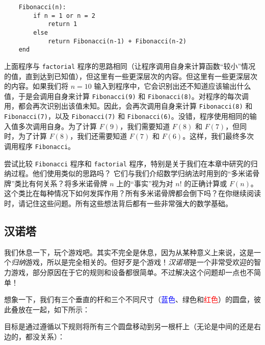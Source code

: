 \begin{verbatim}
    Fibonacci(n):
        if n = 1 or n = 2
            return 1
        else
            return Fibonacci(n-1) + Fibonacci(n-2)
    end
\end{verbatim}

上面程序与 \verb|factorial| 程序的思路相同（让程序调用自身来计算函数``较小''情况的值，直到达到已知值），但这里有一些更深层次的内容。但这里有一些更深层次的内容。如果我们将 $n = 10$ 输入到程序中，它会识别出还不知道应该输出什么值，于是会调用自身来计算 \verb|Fibonacci(9)| 和 \verb|Fibonacci(8)|。对程序的每次调用，都会再次识别出该值未知。因此，会再次调用自身来计算 \verb|Fibonacci(8)| 和 \verb|Fibonacci(7)|，以及 \verb|Fibonacci(7)| 和 \verb|Fibonacci(6)|。没错，程序使用相同的输入值多次调用自身。为了计算 $F(9)$，我们需要知道 $F(8)$ 和 $F(7)$，但同时，为了计算 $F(8)$，我们还需要知道 $F(7) $ 和 $F(6)$。这样，我们最终多次调用程序 \verb|Fibonacci|。

尝试比较 \verb|Fibonacci| 程序和 \verb|factorial| 程序，特别是关于我们在本章中研究的归纳过程。他们使用类似的思路吗？ 它们与我们介绍数学归纳法时用到的``多米诺骨牌''类比有何关系？将多米诺骨牌 $n$ 上的``事实''视为对 $n!$ 的正确计算或 $F(n)$。这个类比在每种情况下如何发挥作用？所有多米诺骨牌都会倒下吗？在你继续阅读时，请记住这些问题。所有这些想法背后都有一些非常强大的数学基础。

\clearpage

\subsection{汉诺塔}

我们休息一下，玩个游戏吧。其实不完全是休息，因为从某种意义上来说，这是一个\emph{归纳}游戏，所以是完全相关的。但好歹是个游戏！\emph{汉诺塔}是一个非常受欢迎的智力游戏，部分原因在于它的规则和设备都很简单。不过解决这个问题却一点也不简单！

想象一下，我们有三个垂直的杆和三个不同尺寸（\textcolor{blue}{蓝色}、\textcolor{olivegreen}{绿色}和\textcolor{red}{红色}）的圆盘，彼此叠放在一起，如下所示：

\begin{center}
\end{center}
目标是通过遵循以下规则将所有三个圆盘移动到另一根杆上（无论是中间的还是右边的，都没关系）：

